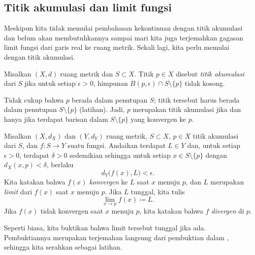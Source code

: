 \subsection{Titik akumulasi dan limit fungsi}

Meskipun kita tidak memulai pembahasan kekontinuan dengan titik akumulasi dan
belum akan membutuhkannya sampai
mari kita juga
terjemahkan gagasan limit fungsi dari garis real ke ruang
metrik.
Sekali lagi, kita perlu memulai dengan titik akumulasi.

\begin{defn}
Misalkan $(X,d)$ ruang metrik dan
$S \subset X$. Titik $p \in X$ disebut
\emph{titik akumulasi} dari $S$
jika untuk setiap $\epsilon > 0$, himpunan $B(p,\epsilon) \cap S
\setminus \{ p \}$ tidak kosong.
\end{defn}

Tidak cukup bahwa $p$ berada dalam penutupan $S$;
titik tersebut harus berada dalam penutupan
$S \setminus \{ p \}$ (latihan).
Jadi, $p$ merupakan titik akumulasi jika dan hanya jika terdapat barisan dalam $S \setminus
\{ p \}$ yang konvergen ke $p$.

\begin{defn}
%
Misalkan $(X,d_X)$ dan $(Y,d_Y)$ ruang metrik, $S \subset X$, $p \in X$ titik akumulasi dari $S$,
dan $f \colon S \to Y$ suatu fungsi.
Andaikan terdapat $L \in Y$ dan, untuk setiap $\epsilon > 0$,
terdapat $\delta > 0$ sedemikian sehingga untuk setiap $x \in S \setminus \{ p \}$
dengan $d_X(x,p) < \delta$, berlaku
\begin{equation*}
d_Y\bigl(f(x),L\bigr) < \epsilon .
\end{equation*}
Kita katakan bahwa $f(x)$
\emph{konvergen} ke $L$ saat $x$ menuju
$p$, dan $L$ merupakan \emph{limit} dari $f(x)$ saat $x$
menuju $p$.  Jika $L$ tunggal, kita tulis
\begin{equation*}
\lim_{x \to p} f(x) \coloneqq L .
\end{equation*}
Jika $f(x)$ tidak konvergen saat $x$ menuju $p$, kita katakan bahwa $f$
\emph{divergen} di $p$.
\end{defn}

Seperti biasa, kita buktikan bahwa limit tersebut tunggal jika ada.
Pembuktiannya merupakan terjemahan langsung dari pembuktian
dalam , sehingga kita serahkan sebagai latihan.

